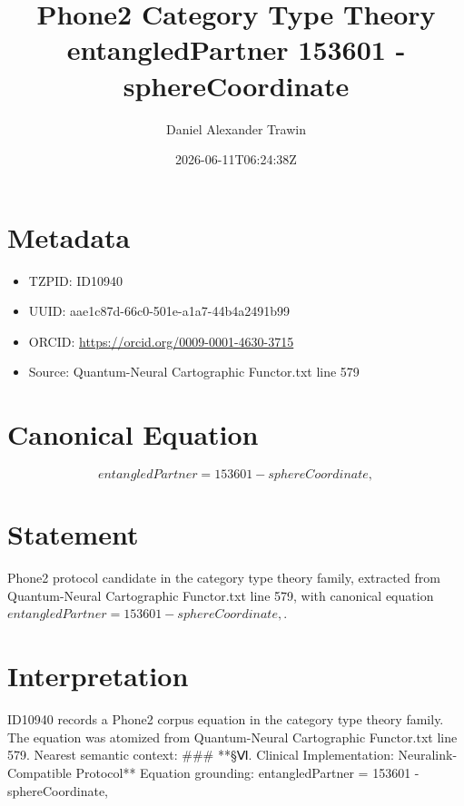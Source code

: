 \documentclass[11pt]{article}
\title{Phone2 Category Type Theory entangledPartner 153601 - sphereCoordinate}
\author{Daniel Alexander Trawin}
\date{2026-06-11T06:24:38Z}
\begin{document}
\maketitle
\section*{Metadata}
\begin{itemize}
\item TZPID: ID10940
\item UUID: aae1c87d-66c0-501e-a1a7-44b4a2491b99
\item ORCID: \url{https://orcid.org/0009-0001-4630-3715}
\item Source: Quantum-Neural Cartographic Functor.txt line 579
\end{itemize}
\section*{Canonical Equation}
\[
entangledPartner = 153601 - sphereCoordinate,
\]
\section*{Statement}
Phone2 protocol candidate in the category type theory family, extracted from Quantum-Neural Cartographic Functor.txt line 579, with canonical equation $entangledPartner = 153601 - sphereCoordinate,$.
\section*{Interpretation}
ID10940 records a Phone2 corpus equation in the category type theory family. The equation was atomized from Quantum-Neural Cartographic Functor.txt line 579. Nearest semantic context: ### **§Ⅵ. Clinical Implementation: Neuralink-Compatible Protocol** Equation grounding: entangledPartner = 153601 - sphereCoordinate,
\end{document}
